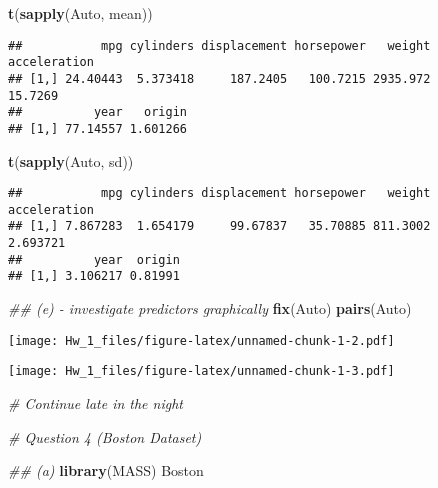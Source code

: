 \documentclass[]{article}
\newenvironment{Shaded}{\begin{snugshade}}{\end{snugshade}}
\newcommand{\CommentTok}[1]{\textcolor[rgb]{0.56,0.35,0.01}{\textit{#1}}}
\newcommand{\DataTypeTok}[1]{\textcolor[rgb]{0.13,0.29,0.53}{#1}}
\newcommand{\DecValTok}[1]{\textcolor[rgb]{0.00,0.00,0.81}{#1}}
\newcommand{\KeywordTok}[1]{\textcolor[rgb]{0.13,0.29,0.53}{\textbf{#1}}}
\newcommand{\NormalTok}[1]{#1}
\newcommand{\OperatorTok}[1]{\textcolor[rgb]{0.81,0.36,0.00}{\textbf{#1}}}
\begin{document}
\begin{Shaded}
\begin{Highlighting}[]
\KeywordTok{t}\NormalTok{(}\KeywordTok{sapply}\NormalTok{(Auto, mean))}
\end{Highlighting}
\end{Shaded}

\begin{verbatim}
##           mpg cylinders displacement horsepower   weight acceleration
## [1,] 24.40443  5.373418     187.2405   100.7215 2935.972      15.7269
##          year   origin
## [1,] 77.14557 1.601266
\end{verbatim}

\begin{Shaded}
\begin{Highlighting}[]
\KeywordTok{t}\NormalTok{(}\KeywordTok{sapply}\NormalTok{(Auto, sd))}
\end{Highlighting}
\end{Shaded}

\begin{verbatim}
##           mpg cylinders displacement horsepower   weight acceleration
## [1,] 7.867283  1.654179     99.67837   35.70885 811.3002     2.693721
##          year  origin
## [1,] 3.106217 0.81991
\end{verbatim}

\begin{Shaded}
\begin{Highlighting}[]
\CommentTok{## (e) - investigate predictors graphically}
\KeywordTok{fix}\NormalTok{(Auto)}
\KeywordTok{pairs}\NormalTok{(Auto)}
\end{Highlighting}
\end{Shaded}

\texttt{[image: Hw\_1\_files/figure-latex/unnamed-chunk-1-2.pdf]}

\begin{Shaded}
\end{Shaded}

\texttt{[image: Hw\_1\_files/figure-latex/unnamed-chunk-1-3.pdf]}

\begin{Shaded}
\begin{Highlighting}[]
\CommentTok{# Continue late in the night}


\CommentTok{# Question 4 (Boston Dataset)}

\CommentTok{## (a)}
\KeywordTok{library}\NormalTok{(MASS)}
\NormalTok{Boston}
\end{Highlighting}
\end{Shaded}
\end{document}

